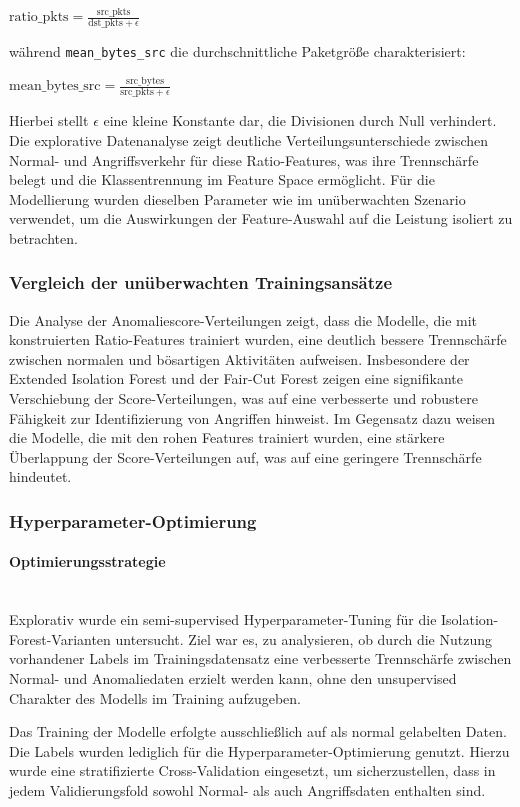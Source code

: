 \documentclass[12pt,oneside]{article}
\begin{document}
	
	$\text{ratio\_pkts} = \frac{\text{src\_pkts}}{\text{dst\_pkts} + \epsilon}$
	
	während \texttt{mean\_bytes\_src} die durchschnittliche Paketgröße charakterisiert:
	
	$\text{mean\_bytes\_src} = \frac{\text{src\_bytes}}{\text{src\_pkts} + \epsilon}$
	
	Hierbei stellt $\epsilon$ eine kleine Konstante dar, die Divisionen durch Null verhindert.
	Die explorative Datenanalyse zeigt deutliche Verteilungsunterschiede zwischen Normal- und Angriffsverkehr für diese Ratio-Features, was ihre Trennschärfe belegt und die Klassentrennung im Feature Space ermöglicht. Für die Modellierung wurden dieselben Parameter wie im unüberwachten Szenario verwendet, um die Auswirkungen der Feature-Auswahl auf die Leistung isoliert zu betrachten.
	\subsubsection{Vergleich der unüberwachten Trainingsansätze}
	Die Analyse der Anomaliescore-Verteilungen zeigt, dass die Modelle, die mit konstruierten Ratio-Features trainiert wurden, eine deutlich bessere Trennschärfe zwischen normalen und bösartigen Aktivitäten aufweisen. Insbesondere der Extended Isolation Forest und der Fair-Cut Forest zeigen eine signifikante Verschiebung der Score-Verteilungen, was auf eine verbesserte und robustere Fähigkeit zur Identifizierung von Angriffen hinweist. Im Gegensatz dazu weisen die Modelle, die mit den rohen Features trainiert wurden, eine stärkere Überlappung der Score-Verteilungen auf, was auf eine geringere Trennschärfe hindeutet.
	\subsubsection{Hyperparameter-Optimierung}
	\paragraph{Optimierungsstrategie} \mbox{}\\
	Explorativ wurde ein semi-supervised Hyperparameter-Tuning für die Isolation-Forest-Varianten untersucht. Ziel war es, zu analysieren, ob durch die Nutzung vorhandener Labels im Trainingsdatensatz eine verbesserte Trennschärfe zwischen Normal- und Anomaliedaten erzielt werden kann, ohne den unsupervised Charakter des Modells im Training aufzugeben.

	Das Training der Modelle erfolgte ausschließlich auf als normal gelabelten Daten. Die Labels wurden lediglich für die Hyperparameter-Optimierung genutzt. Hierzu wurde eine stratifizierte Cross-Validation eingesetzt, um sicherzustellen, dass in jedem Validierungsfold sowohl Normal- als auch Angriffsdaten enthalten sind.
\end{document}
